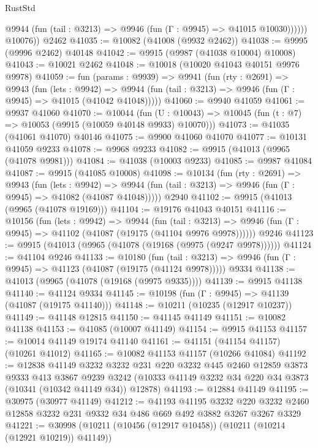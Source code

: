 \begin{lexlean}{RustStd}
\begin{coremodule}
              @9944 (fun (tail : @3213) => @9946 (fun (Γ : @9945) => @41015 @10030))))))
        @10076))
    @2462
@41035 := @10082 (@41008 (@9932 @2462))
@41038 := @9995 (@9996 @2462) @40148
@41042 := @9915 (@9987 (@41038 @10004) @10008)
@41043 := @10021 @2462
@41048 := @10018 (@10020 @41043 @40151 @9976 @9978)
@41059 := fun (params : @9939) =>
  @9941
    (fun (rty : @2691) =>
    @9943
      (fun (lets : @9942) =>
      @9944 (fun (tail : @3213) => @9946 (fun (Γ : @9945) => @41015 (@41042 @41048)))))
@41060 := @9940 @41059
@41061 := @9937 @41060
@41070 := @10044
    (fun (U : @10043) => @10045 (fun (t : @7) => @10053 (@9915 (@10059 @40148 @9933) @10070)))
@41073 := @41035 (@41061 @41070) @40146
@41075 := @9900 @41060 @41070
@41077 := @10131 @41059 @9233
@41078 := @9968 @9233
@41082 := @9915 (@41013 (@9965 (@41078 @9981)))
@41084 := @41038 (@10003 @9233)
@41085 := @9987 @41084
@41087 := @9915 (@41085 @10008)
@41098 := @10134
    (fun (rty : @2691) =>
    @9943
      (fun (lets : @9942) =>
      @9944 (fun (tail : @3213) => @9946 (fun (Γ : @9945) => @41082 (@41087 @41048)))))
    @2940
@41102 := @9915 (@41013 (@9965 (@41078 @19169)))
@41104 := @19176 @41043 @40151
@41116 := @10156
    (fun (lets : @9942) =>
    @9944
      (fun (tail : @3213) =>
      @9946 (fun (Γ : @9945) => @41102 (@41087 (@19175 (@41104 @9976 @9978))))))
    @9246
@41123 := @9915 (@41013 (@9965 (@41078 (@19168 (@9975 (@9247 @9978))))))
@41124 := @41104 @9246
@41133 := @10180
    (fun (tail : @3213) => @9946 (fun (Γ : @9945) => @41123 (@41087 (@19175 (@41124 @9978)))))
    @9334
@41138 := @41013 (@9965 (@41078 (@19168 (@9975 @9335))))
@41139 := @9915 @41138
@41140 := @41124 @9334
@41145 := @10198 (fun (Γ : @9945) => @41139 (@41087 (@19175 @41140)))
@41148 := @10211 (@10235 (@12917 @10237))
@41149 := @41148 @12815
@41150 := @41145 @41149
@41151 := @10082 @41138
@41153 := @41085 (@10007 @41149)
@41154 := @9915 @41153
@41157 := @10014 @41149 @19174 @41140
@41161 := @41151 (@41154 @41157) (@10261 @41012)
@41165 := @10082 @41153 @41157 (@10266 @41084)
@41192 := @12838
    @41149
    @3232
    @3232
    @231
    @220
    @3232
    @445
    @2460
    @12859
    @3873
    @9333
    @413
    @3867
    @9239
    @3242
    (@10333 @41149 @3232 @34 @220 @34 @3873 (@10341 (@10342 @41149 @34)) @12878)
@41193 := @12884 @41149
@41195 := @30975 (@30977 @41149)
@41212 := @41193
    @41195
    @3232
    @220
    @3232
    @2460
    @12858
    @3232
    @231
    @9332
    @34
    @486
    @669
    @492
    @3882
    @3267
    @3267
    @3329
@41221 := @30998 (@10211 (@10456 (@12917 @10458)) (@10211 (@10214 (@12921 @10219)) @41149))

\end{coremodule}
\end{lexlean}
